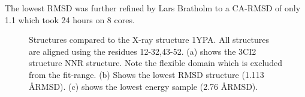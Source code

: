 The lowest RMSD was further refined by Lars Bratholm to a CA-RMSD of only 1.1 which took 24 hours on 8 cores.


\begin{figure}%
    \centering
    \caption{Structures compared to the X-ray structure 1YPA. All structures are aligned using the residues 12-32,43-52. (a) shows the 3CI2 structure NNR structure. Note the flexible domain which is excluded from the fit-range. (b) Shows the lowest RMSD structure (1.113 \AA RMSD). (c) shows the lowest energy sample (2.76 \AA RMSD). }
    \label{fig:ci2}%
\end{figure}



